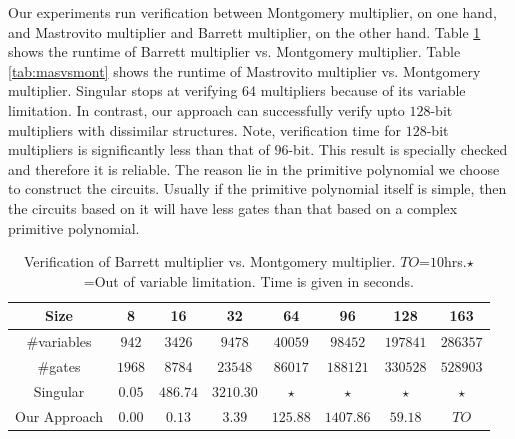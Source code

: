 Our experiments run verification between Montgomery multiplier, on one hand, and 
 Mastrovito multiplier and Barrett multiplier, on the other hand.
Table \ref{tab:bvsmont} shows the runtime of Barrett multiplier vs. Montgomery multiplier. 
Table \ref{tab:masvsmont} shows the runtime of Mastrovito multiplier vs. Montgomery multiplier. 
Singular stops at verifying $64$ multipliers because of its variable limitation.
In contrast, our approach can successfully verify upto $128$-bit multipliers with dissimilar structures.
Note, verification time for $128$-bit multipliers is significantly less than that of $96$-bit. This result is specially checked and 
therefore it is reliable. The reason lie in the primitive polynomial we choose to construct the circuits. 
Usually if the primitive polynomial itself is simple, then the circuits based on it will have 
less gates than that based on a complex primitive polynomial.


\begin{table}[h!]
\begin{center}
\caption{ Verification of Barrett multiplier vs. Montgomery multiplier. $TO$=$10$hrs.$\star$=Out of variable limitation.
Time is given in seconds.}
\label{tab:bvsmont}
\begin{tabular}{|c||c|c|c|c|c|c|c|} \hline 
Size   			&8  		&16       	&32       	&64         &96   		&128		&163	\\
\hline 
\#variables 	&$942$ 		&$3426$ 	&$9478$ 	&$40059$ 	&$98452$ 	&$197841$ 	&$286357$ 	\\
\hline 
\#gates 		&$1968$  	&$8784$    	&$23548$   	&$86017$    &$188121$  	&$330528$	&$528903$\\
\hline
Singular		&$0.05$  	&$486.74$   &$3210.30$  &$\star$   	&$\star$ 	&$\star$ 	&$\star$	\\
\hline
\hline
Our Approach   	&$0.00$  	&$0.13$   	&$3.39$  	&$125.88$  &$1407.86$  &$59.18$		&$TO$ \\
\hline
\end{tabular}
\end{center}
\end{table}

